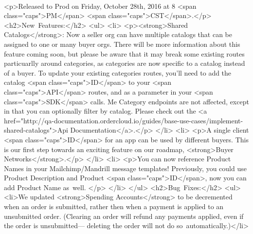 \documentclass{memoir}%
\begin{document}
\paragraph*{}%

%
\paragraph*{}%
<p>Released to Prod on Friday, October 28th, 2016 at 8 <span class="caps">PM</span> <span class="caps">CST</span>.</p>\newline%
<h2>New~Features:</h2>\newline%
<ul>\newline%
<li>\newline%
<p><strong>Shared Catalogs</strong>: Now a seller org can have multiple catalogs that can be assigned to one or many buyer orgs. There will be more information about this feature coming soon, but please be aware that it may break some existing routes particuarlly around categories, as categories are now specific to a catalog instead of a buyer. To update your existing categories routes, you’ll need to add the catalog <span class="caps">ID</span> to your <span class="caps">API</span> routes, and as a parameter in your <span class="caps">SDK</span> calls. Me Category endpoints are not affected, except in that you can optionally filter by catalog. Please check out the <a href="http://qa{-}documentation.ordercloud.io/guides/base{-}use{-}cases/implement{-}shared{-}catalogs">Api Documentation</a>.</p>\newline%
</li>\newline%
<li>\newline%
<p>A single client <span class="caps">ID</span> for an app can be used by different buyers. This is our first step towards an exciting feature on our roadmap, <strong>Buyer Networks</strong>.</p>\newline%
</li>\newline%
<li>\newline%
<p>You can now reference Product Names in your Mailchimp/Mandrill message templates! Previously, you could use Product Description and Product <span class="caps">ID</span>, now you can add Product Name as~well. </p>\newline%
</li>\newline%
</ul>\newline%
<h2>Bug~Fixes:</h2>\newline%
<ul>\newline%
<li>We updated <strong>Spending Accounts</strong> to be decremented when an order is submitted, rather then when a payment is applied to an unsubmitted order. (Clearing an order will refund any payments applied, even if the order is unsubmitted— deleting the order will not do so~automatically.)</li>\newline%
\end{document}
